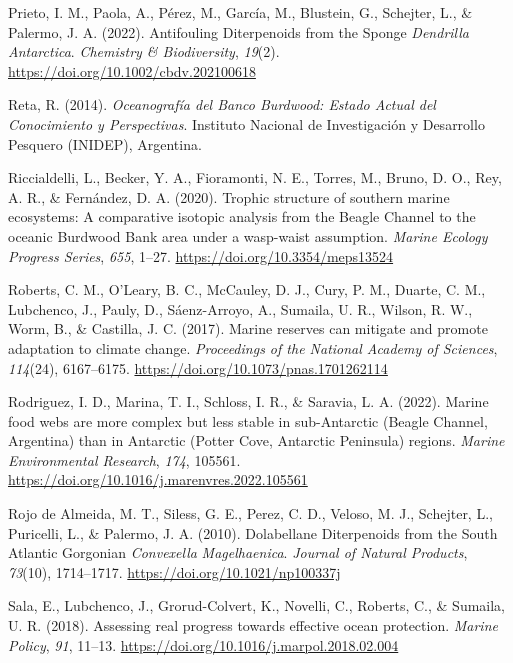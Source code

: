 \documentclass[preprint, 3p,
authoryear]{elsarticle} %
\newlength{\cslhangindent}
\newlength{\cslentryspacingunit} %
\newenvironment{CSLReferences}[2] %
 {%
  \setlength{\parindent}{0pt}
  \ifodd #1
  \let\oldpar\par
  \def\par{\hangindent=\cslhangindent\oldpar}
  \fi
  \setlength{\parskip}{#2\cslentryspacingunit}
 }%
 {}
\begin{document}
\begin{CSLReferences}{1}{0}
\leavevmode{}%
Prieto, I. M., Paola, A., Pérez, M., García, M., Blustein, G., Schejter,
L., \& Palermo, J. A. (2022). Antifouling {Diterpenoids} from the
{Sponge} {\emph{Dendrilla}}{ \emph{Antarctica}}. \emph{Chemistry \&
Biodiversity}, \emph{19}(2).
\url{https://doi.org/10.1002/cbdv.202100618}

\leavevmode{}%
Reta, R. (2014). \emph{Oceanografía del {Banco Burdwood}: {Estado
Actual} del {Conocimiento} y {Perspectivas}}. {Instituto Nacional de
Investigación y Desarrollo Pesquero (INIDEP), Argentina}.

\leavevmode{}%
Riccialdelli, L., Becker, Y. A., Fioramonti, N. E., Torres, M., Bruno,
D. O., Rey, A. R., \& Fernández, D. A. (2020). Trophic structure of
southern marine ecosystems: A comparative isotopic analysis from the
{Beagle Channel} to the oceanic {Burdwood Bank} area under a wasp-waist
assumption. \emph{Marine Ecology Progress Series}, \emph{655}, 1--27.
\url{https://doi.org/10.3354/meps13524}

\leavevmode{}%
Roberts, C. M., O'Leary, B. C., McCauley, D. J., Cury, P. M., Duarte, C.
M., Lubchenco, J., Pauly, D., Sáenz-Arroyo, A., Sumaila, U. R., Wilson,
R. W., Worm, B., \& Castilla, J. C. (2017). Marine reserves can mitigate
and promote adaptation to climate change. \emph{Proceedings of the
National Academy of Sciences}, \emph{114}(24), 6167--6175.
\url{https://doi.org/10.1073/pnas.1701262114}

\leavevmode{}%
Rodriguez, I. D., Marina, T. I., Schloss, I. R., \& Saravia, L. A.
(2022). Marine food webs are more complex but less stable in
sub-{Antarctic} ({Beagle Channel}, {Argentina}) than in {Antarctic}
({Potter Cove}, {Antarctic Peninsula}) regions. \emph{Marine
Environmental Research}, \emph{174}, 105561.
\url{https://doi.org/10.1016/j.marenvres.2022.105561}

\leavevmode{}%
Rojo de Almeida, M. T., Siless, G. E., Perez, C. D., Veloso, M. J.,
Schejter, L., Puricelli, L., \& Palermo, J. A. (2010). Dolabellane
{Diterpenoids} from the {South Atlantic Gorgonian} {\emph{Convexella}}{
\emph{Magelhaenica}}. \emph{Journal of Natural Products}, \emph{73}(10),
1714--1717. \url{https://doi.org/10.1021/np100337j}

\leavevmode{}%
Sala, E., Lubchenco, J., Grorud-Colvert, K., Novelli, C., Roberts, C.,
\& Sumaila, U. R. (2018). Assessing real progress towards effective
ocean protection. \emph{Marine Policy}, \emph{91}, 11--13.
\url{https://doi.org/10.1016/j.marpol.2018.02.004}


\end{CSLReferences}
\end{document}
